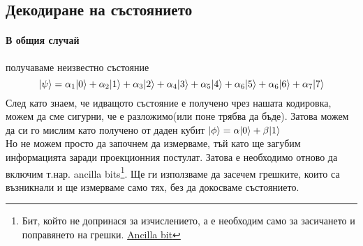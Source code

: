 \documentclass[11pt,oneside,a4paper]{article}
\begin{document}
\subsection{Декодиране на състоянието}
\paragraph{В общия случай} получаваме неизвестно състояние
\begin{equation}
    {\left\vert{\psi}\right\rangle} = \alpha_1{\left\vert{0}\right\rangle} + \alpha_2{\left\vert{1}\right\rangle} + \alpha_3{\left\vert{2}\right\rangle} + \alpha_4{\left\vert{3}\right\rangle} + \alpha_5{\left\vert{4}\right\rangle} + \alpha_6{\left\vert{5}\right\rangle} + \alpha_6{\left\vert{6}\right\rangle} + \alpha_7{\left\vert{7}\right\rangle}
\end{equation}
След като знаем, че идващото състояние е получено чрез нашата кодировка, можем да сме сигурни, че е разложимо(или поне трябва да бъде). Затова можем да си го мислим като получено от даден кубит ${\left\vert{\phi}\right\rangle} = \alpha{\left\vert{0}\right\rangle} + \beta{\left\vert{1}\right\rangle}$\\
Но не можем просто да започнем да измерваме, тъй като ще загубим информацията заради проекционния постулат. Затова е необходимо отново да включим т.нар. ancilla bits\footnote{
Бит, който не допринася за изчислението, а е необходим само за засичането и поправянето на грешки. \href{https://en.wikipedia.org/wiki/Ancilla_bit}{Ancilla bit}
}. Ще ги използваме да засечем грешките, които са възникнали и ще измерваме само тях, без да докосваме състоянието.
\end{document}
